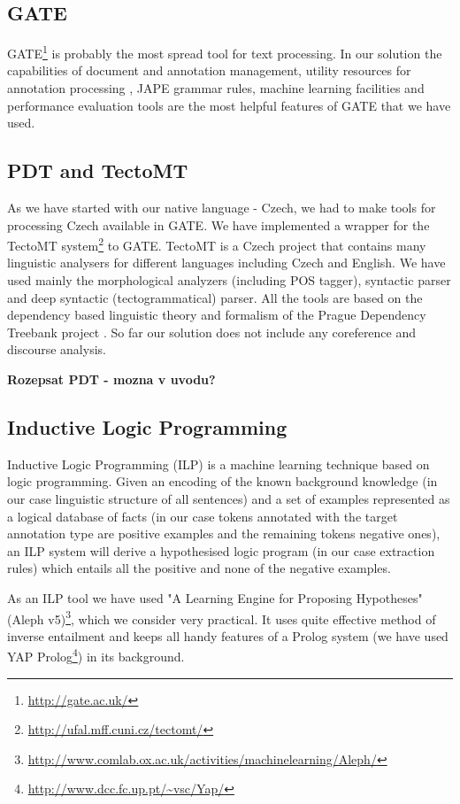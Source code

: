 \documentclass[runningheads,a4paper]{llncs}
\begin{document}
\subsection{GATE}
GATE\footnote{\url{http://gate.ac.uk/}} is probably the most spread tool for text processing. In our solution the capabilities of document and annotation management, utility resources for annotation processing , JAPE grammar rules, machine learning facilities and performance evaluation tools are the most helpful features of GATE that we have used.

\subsection{PDT and TectoMT}
As we have started with our native language - Czech, we had to make tools for processing Czech available in GATE. We have implemented a wrapper for the TectoMT system\footnote{\url{http://ufal.mff.cuni.cz/tectomt/}} \cite{dedek:ZaPtTectoMTHighly2008} to GATE. TectoMT is a Czech project that contains many linguistic analysers for different languages including Czech and English. We have used mainly the morphological analyzers (including POS tagger), syntactic parser and deep syntactic (tectogrammatical) parser. All the tools are based on the dependency based linguistic theory and formalism of the Prague Dependency Treebank project \cite{dedek:PDT20_CD}. So far our solution does not include any coreference and discourse analysis.

\textbf{Rozepsat PDT - mozna v uvodu?}



\subsection{Inductive Logic Programming}
Inductive Logic Programming (ILP) \cite{dedek:MuggletonILP} is a machine learning technique based on logic programming. Given an encoding of the known background knowledge (in our case linguistic structure of all sentences) and a set of examples represented as a logical database of facts (in our case tokens annotated with the target annotation type are positive examples and the remaining tokens negative ones), an ILP system will derive a hypothesised logic program (in our case extraction rules) which entails all the positive and none of the negative examples.

As an ILP tool we have used "A Learning Engine for Proposing Hypotheses" (Aleph v5)\footnote{\url{http://www.comlab.ox.ac.uk/activities/machinelearning/Aleph/}}, which we consider very practical. It uses quite effective method of inverse entailment \cite{biblio:InverseEntailment} and keeps all handy features of a Prolog system (we have used YAP Prolog\footnote{\url{http://www.dcc.fc.up.pt/~vsc/Yap/}}) in its background.
\end{document}
